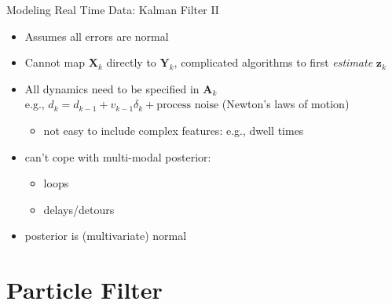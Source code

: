 \documentclass[10pt,t]{beamer}
\newcommand{\bX}{\mathbf{X}}
\newcommand{\bY}{\mathbf{Y}}
\newcommand{\mat}[1]{\mathbf{#1}}
\renewcommand{\vec}[1]{\boldsymbol{#1}}
\begin{document}
\begin{frame}{Modeling Real Time Data: Kalman Filter II}
  \onslide<+->
  \begin{itemize}[<+- | alert@+>]
      \item Assumes all errors are normal

      \item Cannot map $\bX_k$ directly to $\bY_k$,
        complicated algorithms to first \emph{estimate} $\vec{z}_k$

      \item All dynamics need to be specified in $\mat{A}_k$\\
        e.g., $d_k = d_{k-1} + v_{k-1}\delta_k + \text{process noise}$
        (Newton's laws of motion)

        \begin{itemize}
        \item not easy to include complex features: e.g., dwell
          times
        \end{itemize}


      \item can't cope with multi-modal posterior:
        \begin{itemize}[<1->]
          \item loops
          \item delays/detours
        \end{itemize}

      \item posterior is (multivariate) normal
  \end{itemize}
  \onslide<+->
\end{frame}


\section{Particle Filter}
\end{document}
